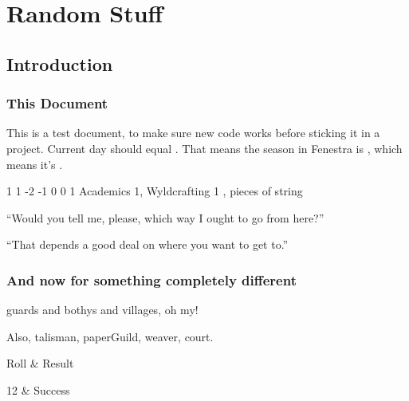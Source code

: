 \documentclass[a4paper,openany]{book}
\date{\today}
\begin{document}
\frontmatter

\chapter{Random Stuff}

\section{Introduction}

\begin{multicols}{2}

\subsection{This Document}

This is a test document, to make sure new code works before sticking it in a project.
Current day should equal .
That means the season in Fenestra is \showSeason, which means it's \showTemperature.

{1}%
{1}%
{{-2}%
{-1}%
{0}}%
{0}%
{1}%
{Academics 1, Wyldcrafting 1
}%
{\Dagger, pieces of string}%
{
  \setcounter{Fate}{2}
}



\begin{speechtext}

  ``Would you tell me, please, which way I ought to go from here?''

  ``That depends a good deal on where you want to get to.''

\end{speechtext}

\subsection{And now for something completely different}

\Glspl{guard} and \glspl{bothy} and \glspl{village}, oh my!

Also, \gls{talisman}, \gls{paperGuild}, \gls{weaver}, \gls{court}.

\begin{boxtable}

Roll & Result \\\hline

12 & Success \\


\end{boxtable}
\end{multicols}
\end{document}

